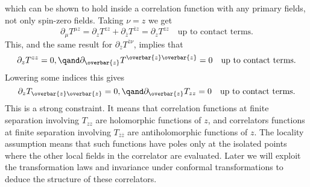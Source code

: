 \documentclass[fleqn]{NotesClass}
\begin{document}
    which can be shown to hold inside a correlation function with any primary fields, not only spin-zero fields.
    Taking \(\nu = z\) we get
    \begin{equation}
        \partial_\mu T^{\mu z} = \partial_z T^{zz} + \partial_{\overbar{z}} T^{\overbar{z}z} = \partial_z T^{zz} \quad \text{up to contact terms}.
    \end{equation}
    This, and the same result for \(\partial_{\overbar{z}}T^{\overbar{z}\nu}\), implies that
    \begin{equation}
        \partial_{z}T^{zz} = 0, \qand \partial_{\overbar{z}}T^{\overbar{z}\overbar{z}} = 0 \quad \text{up to contact terms}.
    \end{equation}
    Lowering some indices this gives
    \begin{equation}
        \partial_z T_{\overbar{z}\overbar{z}} = 0, \qand \partial_{\overbar{z}} T_{zz} = 0 \quad \text{up to contact terms}.
    \end{equation}
    This is a strong constraint.
    It means that correlation functions at finite separation involving \(T_{zz}\) are holomorphic functions of \(z\), and correlators functions at finite separation involving \(T_{\overbar{z}\overbar{z}}\) are antiholomorphic functions of \(z\).
    The locality assumption means that such functions have poles only at the isolated points where the other local fields in the correlator are evaluated.
    Later we will exploit the transformation laws and invariance under conformal transformations to deduce the structure of these correlators.
    
\end{document}
